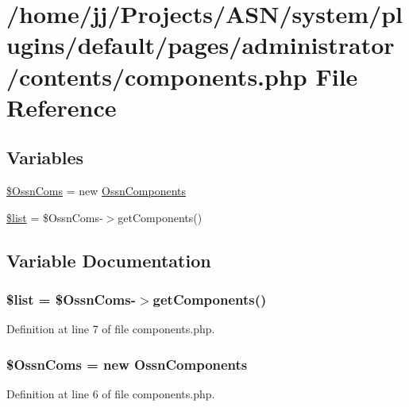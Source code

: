 \hypertarget{components_8php}{}\section{/home/jj/\+Projects/\+A\+S\+N/system/plugins/default/pages/administrator/contents/components.php File Reference}
\label{components_8php}
\subsection*{Variables}
\begin{DoxyCompactItemize}
\item 
\hyperlink{components_8php_a269e9c1471f261d84ee1a4f55bd70853}{\$\+Ossn\+Coms} = new \hyperlink{class_ossn_components}{Ossn\+Components}
\item 
\hyperlink{components_8php_a358b00350db3d8f227d500337cc437af}{\$list} = \$Ossn\+Coms-\/$>$get\+Components()
\end{DoxyCompactItemize}


\subsection{Variable Documentation}
\subsubsection[{\texorpdfstring{\$list}{$list}}]{\setlength{\rightskip}{0pt plus 5cm}\$list = \$Ossn\+Coms-\/$>$get\+Components()}\hypertarget{components_8php_a358b00350db3d8f227d500337cc437af}{}\label{components_8php_a358b00350db3d8f227d500337cc437af}


Definition at line 7 of file components.\+php.

\subsubsection[{\texorpdfstring{\$\+Ossn\+Coms}{$OssnComs}}]{\setlength{\rightskip}{0pt plus 5cm}\$Ossn\+Coms = new {\bf Ossn\+Components}}\hypertarget{components_8php_a269e9c1471f261d84ee1a4f55bd70853}{}\label{components_8php_a269e9c1471f261d84ee1a4f55bd70853}


Definition at line 6 of file components.\+php.

